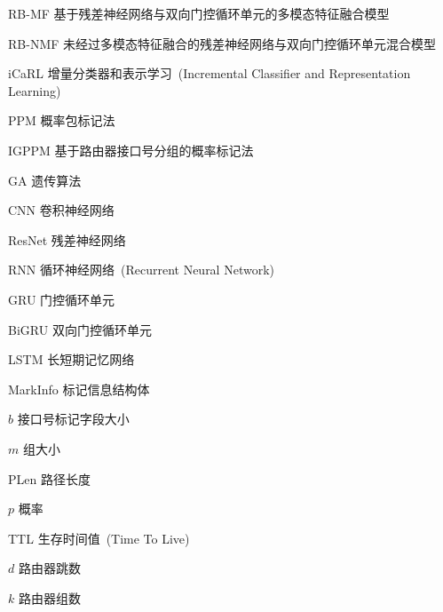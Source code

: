 \begin{denotation}

\item[RB-MF] 基于残差神经网络与双向门控循环单元的多模态特征融合模型
\item[RB-NMF] 未经过多模态特征融合的残差神经网络与双向门控循环单元混合模型
\item[iCaRL] 增量分类器和表示学习~(Incremental Classifier and Representation Learning)
\item[PPM] 概率包标记法
\item[IGPPM] 基于路由器接口号分组的概率标记法
\item[GA]	遗传算法
\item[CNN]	卷积神经网络
\item[ResNet]	残差神经网络
\item[RNN]	循环神经网络~(Recurrent Neural Network)
\item[GRU]	门控循环单元
\item[BiGRU] 双向门控循环单元
\item[LSTM]  	长短期记忆网络
\item [MarkInfo] 标记信息结构体
\item[$b$] 接口号标记字段大小
\item[$m$] 组大小
\item[PLen] 路径长度
\item[$p$] 概率
\item[TTL] 生存时间值~(Time To Live)
\item[$d$] 路由器跳数
\item[$k$] 路由器组数
\end{denotation}
